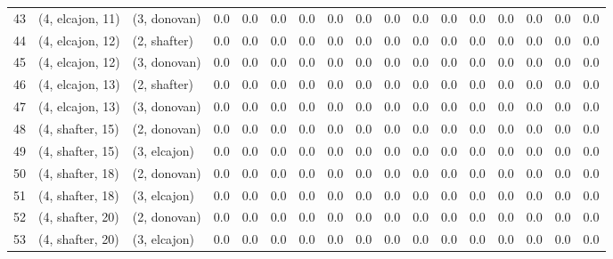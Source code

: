 \begin{tabular}{lllrrrrrrrrrrrrrr}
43 &  (4, elcajon, 11) &     (3, donovan) &      0.0 &     0.0 &        0.0 &       0.0 &      0.0 &      0.0 &      0.0 &        0.0 &       0.0 &     0.0 &     0.0 &     0.0 &       0.0 &      0.0 \\
44 &  (4, elcajon, 12) &     (2, shafter) &      0.0 &     0.0 &        0.0 &       0.0 &      0.0 &      0.0 &      0.0 &        0.0 &       0.0 &     0.0 &     0.0 &     0.0 &       0.0 &      0.0 \\
45 &  (4, elcajon, 12) &     (3, donovan) &      0.0 &     0.0 &        0.0 &       0.0 &      0.0 &      0.0 &      0.0 &        0.0 &       0.0 &     0.0 &     0.0 &     0.0 &       0.0 &      0.0 \\
46 &  (4, elcajon, 13) &     (2, shafter) &      0.0 &     0.0 &        0.0 &       0.0 &      0.0 &      0.0 &      0.0 &        0.0 &       0.0 &     0.0 &     0.0 &     0.0 &       0.0 &      0.0 \\
47 &  (4, elcajon, 13) &     (3, donovan) &      0.0 &     0.0 &        0.0 &       0.0 &      0.0 &      0.0 &      0.0 &        0.0 &       0.0 &     0.0 &     0.0 &     0.0 &       0.0 &      0.0 \\
48 &  (4, shafter, 15) &     (2, donovan) &      0.0 &     0.0 &        0.0 &       0.0 &      0.0 &      0.0 &      0.0 &        0.0 &       0.0 &     0.0 &     0.0 &     0.0 &       0.0 &      0.0 \\
49 &  (4, shafter, 15) &     (3, elcajon) &      0.0 &     0.0 &        0.0 &       0.0 &      0.0 &      0.0 &      0.0 &        0.0 &       0.0 &     0.0 &     0.0 &     0.0 &       0.0 &      0.0 \\
50 &  (4, shafter, 18) &     (2, donovan) &      0.0 &     0.0 &        0.0 &       0.0 &      0.0 &      0.0 &      0.0 &        0.0 &       0.0 &     0.0 &     0.0 &     0.0 &       0.0 &      0.0 \\
51 &  (4, shafter, 18) &     (3, elcajon) &      0.0 &     0.0 &        0.0 &       0.0 &      0.0 &      0.0 &      0.0 &        0.0 &       0.0 &     0.0 &     0.0 &     0.0 &       0.0 &      0.0 \\
52 &  (4, shafter, 20) &     (2, donovan) &      0.0 &     0.0 &        0.0 &       0.0 &      0.0 &      0.0 &      0.0 &        0.0 &       0.0 &     0.0 &     0.0 &     0.0 &       0.0 &      0.0 \\
53 &  (4, shafter, 20) &     (3, elcajon) &      0.0 &     0.0 &        0.0 &       0.0 &      0.0 &      0.0 &      0.0 &        0.0 &       0.0 &     0.0 &     0.0 &     0.0 &       0.0 &      0.0 \\
\bottomrule
\end{tabular}
